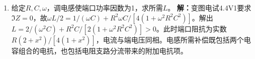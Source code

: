 \documentclass[UTF8,fontset=fandol,a4paper,11pt]{ctexart}
\begin{document}
\begin{enumerate}
\item 给定$R,C,\omega$，调电感使端口功率因数为1，求所需$L$。
\textbf{解：}变图电试4.4V1要求$\Im Z=0$，故$\omega L/2=1/(\omega C)+R^2\omega C/[4(1+\omega^2R^2C^2)]$。解出$L=2/(\omega^2C)+R^2C/[2(1+\omega^2R^2C^2)]>0$。此时端口阻抗为实数$R(2+x^2)/[4(1+x^2)]$，电流与端电压同相。电感所需补偿既包括两个电容组合的电抗，也包括电阻支路分流带来的附加电抗项。
\begin{center}\begin{minipage}{.98\linewidth}\centering
{}
\end{minipage}
\end{center}
\end{enumerate}
\end{document}
